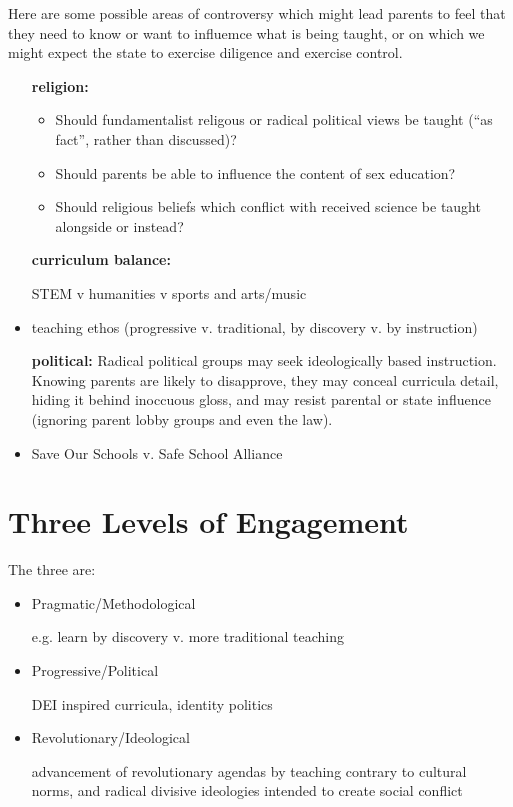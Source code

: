 \documentclass[10pt,titlepage]{article}
\begin{document}
Here are some possible areas of controversy which might lead parents to feel that they need to know or want to influemce what is being taught, or on which we might expect the state to exercise diligence and exercise control.

\begin{itemize}

\item[\bf religion:]

  \begin{itemize}
    
  \item Should fundamentalist religous or radical political views be taught (``as fact'', rather than discussed)?
  \item Should parents be able to influence the content of sex education?
    \item Should religious beliefs which conflict with received science be taught alongside or instead?
  \end{itemize}
  
\item[\bf curriculum balance:]

  STEM v humanities v sports and arts/music

  \item teaching ethos (progressive v. traditional, by discovery v. by instruction)

  \item[\bf political:]
    Radical political groups may seek ideologically based instruction.
    Knowing parents are likely to disapprove, they may conceal curricula detail, hiding it behind inoccuous gloss, and may resist parental or state influence (ignoring parent lobby groups and even the law).

    \item Save Our Schools v. Safe School Alliance
    
\end{itemize}

\section{Three Levels of Engagement}

The three are:

\begin{itemize}
\item Pragmatic/Methodological

  e.g. learn by discovery v. more traditional teaching

\item Progressive/Political

DEI inspired curricula, identity politics
  
\item Revolutionary/Ideological

  advancement of revolutionary agendas by teaching contrary to cultural norms, and radical divisive ideologies intended to create social conflict
\end{itemize}
\end{document}
